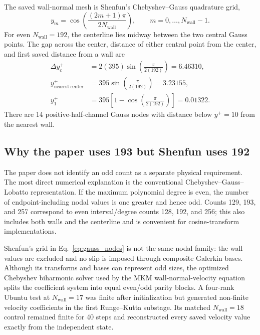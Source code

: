 \documentclass[11pt]{article}
\begin{document}
The saved wall-normal mesh is Shenfun's Chebyshev--Gauss quadrature grid,
\begin{equation}
  y_m=\cos\left(\frac{(2m+1)\pi}{2N_{\mathrm{wall}}}\right),
  \qquad m=0,\ldots,N_{\mathrm{wall}}-1.
  \label{eq:gauss_nodes}
\end{equation}
For even $N_{\mathrm{wall}}=192$, the centerline lies midway between the two
central Gauss points.  The gap across the center, distance of either central
point from the center, and first saved distance from a wall are
\begin{align}
  \Delta y_c^+
  &=2(395)\sin\left(\frac{\pi}{2(192)}\right)=6.46310,\\
  y_{\mathrm{nearest\ center}}^+
  &=395\sin\left(\frac{\pi}{2(192)}\right)=3.23155,\\
  y_{1}^{+}
  &=395\left[1-\cos\left(\frac{\pi}{2(192)}\right)\right]
    =0.01322.
  \label{eq:wall_spacing}
\end{align}
There are 14 positive-half-channel Gauss nodes with distance below
$y^+=10$ from the nearest wall.

\subsection{Why the paper uses 193 but Shenfun uses 192}

The paper does not identify an odd count as a separate physical requirement.
The most direct numerical explanation is the conventional
Chebyshev--Gauss--Lobatto representation.  If the maximum polynomial degree is
even, the number of endpoint-including nodal values is one greater and hence
odd.  Counts 129, 193, and 257 correspond to even interval/degree counts 128,
192, and 256; this also includes both walls and the centerline and is
convenient for cosine-transform implementations.

Shenfun's grid in Eq.~\eqref{eq:gauss_nodes} is not the same nodal family:
the wall values are excluded and no slip is imposed through composite
Galerkin bases.  Although its transforms and bases can represent odd sizes,
the optimized Chebyshev biharmonic solver used by the MKM
wall-normal-velocity equation splits the coefficient system into equal
even/odd parity blocks.  A four-rank Ubuntu test at
$N_{\mathrm{wall}}=17$ was finite after initialization but generated
non-finite velocity coefficients in the first Runge--Kutta substage.  Its
matched $N_{\mathrm{wall}}=18$ control remained finite for 40 steps and
reconstructed every saved velocity value exactly from the independent state.
\end{document}
